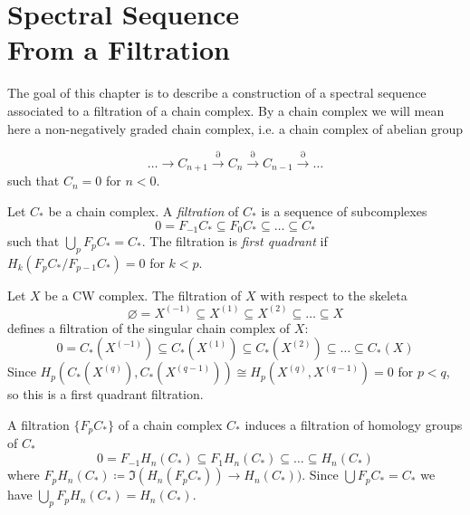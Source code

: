 

\chapter[Spectral Sequence From a Filtration]{Spectral Sequence\\ From a Filtration}
\label{SPECTRAL SEQUENCE FROM FILTRATION CHAPTER}
\thispagestyle{firststyle}


The goal of this chapter is to describe a construction of a spectral sequence 
associated to a filtration of a chain complex. By a chain complex we will mean 
here a non-negatively graded chain complex, 
i.e. a chain complex of abelian group

\[
{\dots} \to 
C_{n+1} \overset{\partial}{\to}  
C_{n} \overset{\partial}{\to}
C_{n-1} \overset{\partial}{\to}
{\dots}
\]
such that $C_{n} = 0$ for $n< 0$.

\begin{definition}
Let $C_{\ast}$ be a chain complex. A \emph{filtration} of $C_{\ast}$
is a sequence of subcomplexes 
\[
0 = F_{-1}C_{\ast} \subseteq F_{0}C_{\ast} \subseteq {\dots} \subseteq  C_{\ast}
\] 
such that $\bigcup_{p}F_{p}C_{\ast} = C_{\ast}$.
The filtration is \emph{first quadrant} if $H_{k}(F_{p}C_{\ast}/F_{p-1}C_{\ast}) = 0$
for $k < p$. 
\end{definition}


\begin{example}
Let $X$ be a CW complex. The filtration of $X$ with respect to the skeleta 
\[
\varnothing = X^{(-1)} \subseteq X^{(1)} \subseteq X^{(2)} \subseteq {\dots} \subseteq X 
\]
defines a filtration of the singular chain complex of $X$:
\[
0  = C_{\ast}(X^{(-1)}) \subseteq C_{\ast}(X^{(1)}) \subseteq C_{\ast}(X^{(2)}) \subseteq {\dots} \subseteq C_{\ast}(X) 
\]
Since $H_{p}(C_{\ast}(X^{(q)}), C_{\ast}(X^{(q-1)})) \cong H_{p}(X^{(q)}, X^{(q-1)}) = 0$
for $p < q$, so this is a first quadrant filtration.

\end{example}


\begin{note} A filtration $\{F_{p}C_{\ast}\}$ of a chain complex $C_{\ast}$ induces a 
filtration of homology groups of $C_{\ast}$
\[
0 = F_{-1}H_{n}(C_{\ast}) \subseteq F_{1}H_{n}(C_{\ast})  \subseteq 
{\dots} \subseteq H_{n}(C_{\ast})
\] 
where $F_{p}H_{n}(C_{\ast}) \coloneq \Im(H_{n}(F_{p}C_{\ast})) \to H_{n}(C_{\ast}))$.
Since $\bigcup F_{p}C_{\ast} = C_{\ast}$ we have 
$\bigcup_{p} F_{p}H_{n}(C_{\ast}) = H_{n}(C_{\ast})$.
\end{note}





